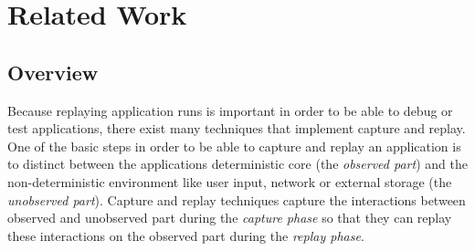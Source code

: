 \chapter{Related Work}

\section{Overview}
Because replaying application runs is important in order to be able to debug or test applications, there exist many techniques that implement capture and replay. One of the basic steps in order to be able to capture and replay an application is to distinct between the applications deterministic core (the \emph{observed part}) and the non-deterministic environment like user input, network or external storage (the \emph{unobserved part}). Capture and replay techniques capture the interactions between observed and unobserved part during the \emph{capture phase} so that they can replay these interactions on the observed part during the \emph{replay phase}.

% 

% 

